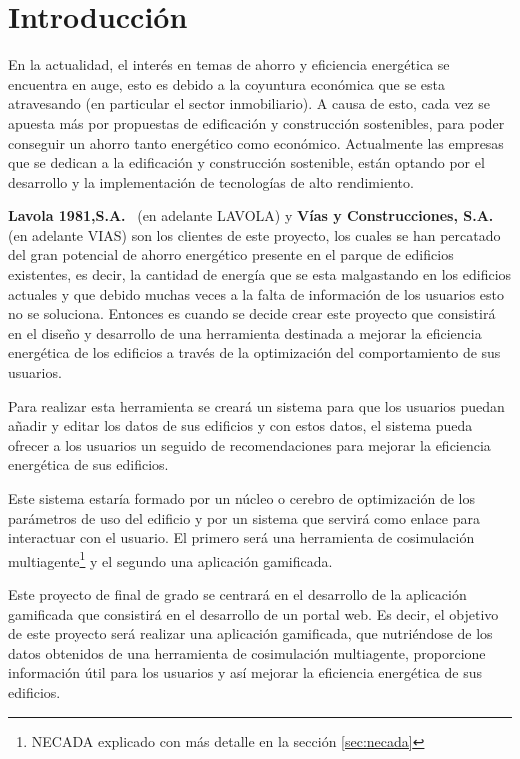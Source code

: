 \section{Introducción}
En la actualidad, el interés en temas de ahorro y eficiencia energética se encuentra en auge, esto es debido a la coyuntura económica que se esta atravesando (en particular el sector inmobiliario). A causa de esto, cada vez se apuesta más por propuestas de edificación y construcción sostenibles, para poder conseguir un ahorro tanto energético como económico. Actualmente las empresas que se dedican a la edificación y construcción sostenible, están optando por el desarrollo y la implementación de tecnologías de alto rendimiento.

\textbf{Lavola 1981,S.A.}~\cite{lavola} (en adelante LAVOLA) y \textbf{Vías y Construcciones, S.A.}~\cite{vias} (en adelante VIAS) son los clientes de este proyecto, los cuales se han percatado del gran potencial de ahorro energético presente en el parque de edificios existentes, es decir, la cantidad de energía que se esta malgastando en los edificios actuales y que debido muchas veces a la falta de información de los usuarios esto no se soluciona. Entonces es cuando se decide crear este proyecto que consistirá en el diseño y desarrollo de una herramienta destinada a mejorar la eficiencia energética de los edificios a través de la optimización del comportamiento de sus usuarios.

Para realizar esta herramienta se creará un sistema para que los usuarios puedan añadir y editar los datos de sus edificios y con estos datos, el sistema pueda ofrecer a los usuarios un seguido de recomendaciones para mejorar la eficiencia energética de sus edificios.

Este sistema estaría formado por un núcleo o cerebro de optimización de los parámetros de uso del edificio y por un sistema que servirá como enlace para interactuar con el usuario. El primero será una herramienta de cosimulación multiagente\footnote{NECADA\cite{necada} explicado con más detalle en la sección \ref{sec:necada}} y el segundo una aplicación gamificada.

Este proyecto de final de grado se centrará en el desarrollo de la aplicación gamificada que consistirá en el desarrollo de un portal web. Es decir, el objetivo de este proyecto será realizar una aplicación gamificada, que nutriéndose de los datos obtenidos de una herramienta de cosimulación multiagente, proporcione información útil para los usuarios y así mejorar la eficiencia energética de sus edificios.








